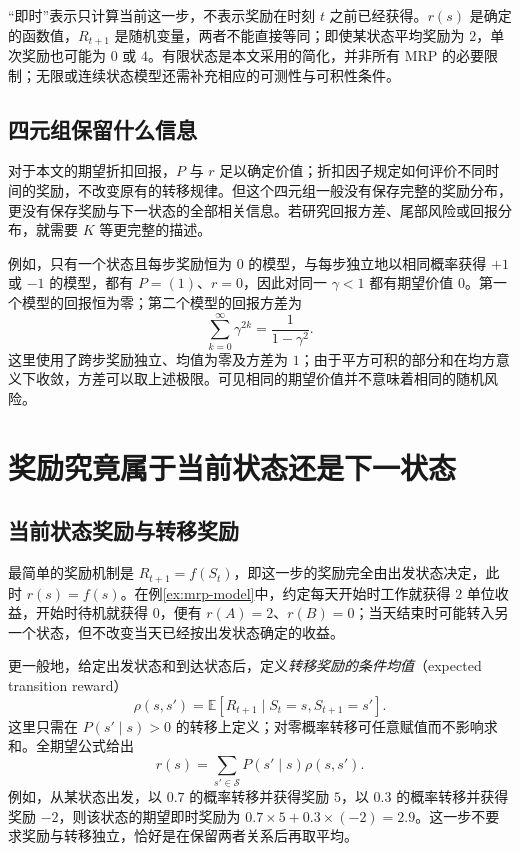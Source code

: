 \documentclass[UTF8,12pt,a4paper,fontset=fandol]{ctexart}
\begin{document}
“即时”表示只计算当前这一步，不表示奖励在时刻 $t$ 之前已经获得。$r(s)$ 是确定的函数值，$R_{t+1}$ 是随机变量，两者不能直接等同；即使某状态平均奖励为 $2$，单次奖励也可能为 $0$ 或 $4$。有限状态是本文采用的简化，并非所有 MRP 的必要限制；无限或连续状态模型还需补充相应的可测性与可积性条件。

\subsection{四元组保留什么信息}

对于本文的期望折扣回报，$P$ 与 $r$ 足以确定价值；折扣因子规定如何评价不同时间的奖励，不改变原有的转移规律。但这个四元组一般没有保存完整的奖励分布，更没有保存奖励与下一状态的全部相关信息。若研究回报方差、尾部风险或回报分布，就需要 $K$ 等更完整的描述。

例如，只有一个状态且每步奖励恒为 $0$ 的模型，与每步独立地以相同概率获得 $+1$ 或 $-1$ 的模型，都有 $P=(1)$、$r=0$，因此对同一 $\gamma<1$ 都有期望价值 $0$。第一个模型的回报恒为零；第二个模型的回报方差为
\[
  \sum_{k=0}^{\infty}\gamma^{2k}=\frac{1}{1-\gamma^2}.
\]
这里使用了跨步奖励独立、均值为零及方差为 $1$；由于平方可积的部分和在均方意义下收敛，方差可以取上述极限。可见相同的期望价值并不意味着相同的随机风险。

\section{奖励究竟属于当前状态还是下一状态}
\label{sec:mrp-reward-timing}

\subsection{当前状态奖励与转移奖励}

最简单的奖励机制是 $R_{t+1}=f(S_t)$，即这一步的奖励完全由出发状态决定，此时 $r(s)=f(s)$。在例\ref{ex:mrp-model}中，约定每天开始时工作就获得 $2$ 单位收益，开始时待机就获得 $0$，便有 $r(A)=2$、$r(B)=0$；当天结束时可能转入另一个状态，但不改变当天已经按出发状态确定的收益。

更一般地，给定出发状态和到达状态后，定义\emph{转移奖励的条件均值}（expected transition reward）
\begin{equation}
  \rho(s,s')=\mathbb E[R_{t+1}\mid S_t=s,S_{t+1}=s'].
  \label{eq:mrp-transition-reward}
\end{equation}
这里只需在 $P(s'\mid s)>0$ 的转移上定义；对零概率转移可任意赋值而不影响求和。全期望公式给出
\begin{equation}
  r(s)=\sum_{s'\in\mathcal S}P(s'\mid s)\rho(s,s').
  \label{eq:mrp-reward-average}
\end{equation}
例如，从某状态出发，以 $0.7$ 的概率转移并获得奖励 $5$，以 $0.3$ 的概率转移并获得奖励 $-2$，则该状态的期望即时奖励为 $0.7\times5+0.3\times(-2)=2.9$。这一步不要求奖励与转移独立，恰好是在保留两者关系后再取平均。
\end{document}
